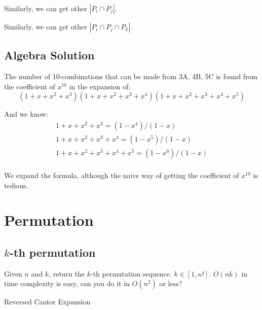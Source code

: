 Similarly, we can get other $|P_i \cap P_j|$.

Similarly, we can get other $|P_i \cap P_j \cap P_k|$.
\subsection{Algebra Solution}
The number of 10-combinations that can be made from 3A, 4B, 5C is found from the coefficient of $x^{10}$ in the expansion of:
$$
(1+x+x^2+x^3)(1+x+x^2+x^3+x^4)(1+x+x^2+x^3+x^4+x^5)
$$

And we know:
\begin{eqnarray*}
1+x+x^2+x^3         = (1-x^4)/(1-x)  \\
1+x+x^2+x^3+x^4     = (1-x^5)/(1-x)  \\
1+x+x^2+x^3+x^4+x^5 = (1-x^6)/(1-x)  \\
\end{eqnarray*}


We expand the formula, although the  naive way of getting the coefficient of $x^{10}$ is tedious. 

\section{Permutation}

\subsection{$k$-th permutation}
Given $n$ and $k$, return the $k$-th permutation sequence. $k\in [1, n!]$. $O(nk)$ in time complexity is easy, can you do it in $O(n^2)$ or less?

Reversed Cantor Expansion

